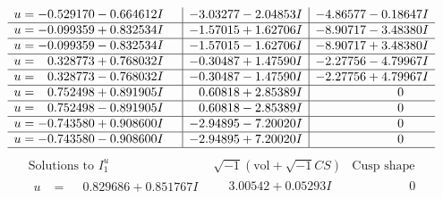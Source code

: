 \documentclass[1p]{elsarticle_modified}
\theoremstyle{definition}
\newcommand{\I}{\sqrt{-1}}
\begin{document}
$$\begin{array}{c|c|c}
\begin{aligned}
u &= -0.529170 - 0.664612 I\end{aligned}
 & -3.03277 - 2.04853 I & -4.86577 - 0.18647 I \\ \hline\begin{aligned}
u &= -0.099359 + 0.832534 I\end{aligned}
 & -1.57015 + 1.62706 I & -8.90717 - 3.48380 I \\ \hline\begin{aligned}
u &= -0.099359 - 0.832534 I\end{aligned}
 & -1.57015 - 1.62706 I & -8.90717 + 3.48380 I \\ \hline\begin{aligned}
u &= \phantom{-}0.328773 + 0.768032 I\end{aligned}
 & -0.30487 + 1.47590 I & -2.27756 - 4.79967 I \\ \hline\begin{aligned}
u &= \phantom{-}0.328773 - 0.768032 I\end{aligned}
 & -0.30487 - 1.47590 I & -2.27756 + 4.79967 I \\ \hline\begin{aligned}
u &= \phantom{-}0.752498 + 0.891905 I\end{aligned}
 & \phantom{-}0.60818 + 2.85389 I & \phantom{-0.000000 } 0 \\ \hline\begin{aligned}
u &= \phantom{-}0.752498 - 0.891905 I\end{aligned}
 & \phantom{-}0.60818 - 2.85389 I & \phantom{-0.000000 } 0 \\ \hline\begin{aligned}
u &= -0.743580 + 0.908600 I\end{aligned}
 & -2.94895 - 7.20020 I & \phantom{-0.000000 } 0 \\ \hline\begin{aligned}
u &= -0.743580 - 0.908600 I\end{aligned}
 & -2.94895 + 7.20020 I & \phantom{-0.000000 } 0\\
 \hline 
 \end{array}$$\newpage$$\begin{array}{c|c|c}  
\text{Solutions to }I^u_{1}& \I (\text{vol} + \sqrt{-1}CS) & \text{Cusp shape}\\
 \hline 
\begin{aligned}
u &= \phantom{-}0.829686 + 0.851767 I\end{aligned}
 & \phantom{-}3.00542 + 0.05293 I & \phantom{-0.000000 } 0 \\ \hline\begin{aligned}

\end{aligned}
\end{array}$$
\end{document}
